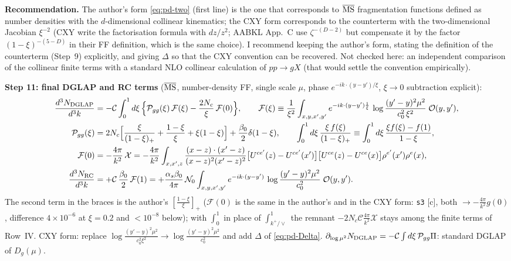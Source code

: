 \documentclass[10pt]{article}
\begin{document}
\medskip
\noindent\textbf{Recommendation.} The author's form \eqref{eq:pd-two} (first line) is the one that corresponds to $\overline{\rm MS}$ fragmentation functions defined as number densities with the $d$-dimensional collinear kinematics; the CXY form corresponds to the counterterm with the two-dimensional Jacobian $\xi^{-2}$ (CXY write the factorisation formula with $dz/z^{2}$; AABKL App.~C use $\zeta^{-(D-2)}$ but compensate it by the factor $(1-\xi)^{-(5-D)}$ in their FF definition, which is the same choice). I recommend keeping the author's form, stating the definition of the counterterm (Step~9) explicitly, and giving $\Delta$ so that the CXY convention can be recovered. Not checked here: an independent comparison of the collinear finite terms with a standard NLO collinear calculation of $pp\to gX$ (that would settle the convention empirically).

\medskip
\noindent\textbf{Step 11: final DGLAP and RC terms} ($\overline{\rm MS}$, number-density FF, single scale $\mu$, phase $e^{-ik\cdot(y-y')/\xi}$, $\xi\to0$ subtraction explicit):
\begin{align}
\frac{d^{3}N_{\rm DGLAP}}{d^{3}k}&=-\mathcal{C}\int_{0}^{1}d\xi\,\Big\{\mathcal{P}_{gg}(\xi)\,\mathcal{F}(\xi)-\frac{2N_{c}}{\xi}\,\mathcal{F}(0)\Big\},\qquad
\mathcal{F}(\xi)\equiv\frac{1}{\xi^{2}}\int_{x,y,x',y'}e^{-ik\cdot(y-y')\frac{1}{\xi}}\,\log\frac{(y'-y)^{2}\mu^{2}}{c_{0}^{2}\,\xi^{2}}\;\mathcal{O}(y,y'),\notag\\
\mathcal{P}_{gg}(\xi)&=2N_{c}\Big[\frac{\xi}{(1-\xi)_{+}}+\frac{1-\xi}{\xi}+\xi(1-\xi)\Big]+\frac{\beta_{0}}{2}\delta(1-\xi),\qquad\int_{0}^{1}d\xi\,\frac{\xi\,f(\xi)}{(1-\xi)_{+}}\equiv\int_{0}^{1}d\xi\,\frac{\xi f(\xi)-f(1)}{1-\xi},\notag\\
\mathcal{F}(0)&=-\frac{4\pi}{k^{2}}\,\mathcal{X}=-\frac{4\pi}{k^{2}}\int_{x,x',z}\frac{(x-z)\cdot(x'-z)}{(x-z)^{2}(x'-z)^{2}}\big[U^{ce'}(z)-U^{ce'}(x')\big]\big[U^{ce}(z)-U^{ce}(x)\big]\rho^{e'}(x')\rho^{e}(x),\notag\\
\frac{d^{3}N_{\rm RC}}{d^{3}k}&=+\mathcal{C}\,\frac{\beta_{0}}{2}\,\mathcal{F}(1)=+\frac{\alpha_{s}\beta_{0}}{4\pi}\,\mathcal{N}_{0}\int_{x,y,x',y'}e^{-ik\cdot(y-y')}\,\log\frac{(y'-y)^{2}\mu^{2}}{c_{0}^{2}}\;\mathcal{O}(y,y').
\label{eq:pd-final}
\end{align}
The second term in the braces is the author's $[\frac{1-\xi}{\xi}]_{+}$ ($\mathcal{F}(0)$ is the same in the author's and in the CXY form: \texttt{s3} [c], both $\to-\frac{4\pi}{k^{2}}g(0)$, difference $4\times10^{-6}$ at $\xi=0.2$ and $<10^{-8}$ below); with $\int_{0}^{1}$ in place of $\int_{k^{+}/\vee}^{1}$ the remnant $-2N_{c}\mathcal{C}\frac{4\pi}{k^{2}}\mathcal{X}$ stays among the finite terms of Row~IV. CXY form: replace $\log\frac{(y'-y)^{2}\mu^{2}}{c_{0}^{2}\xi^{2}}\to\log\frac{(y'-y)^{2}\mu^{2}}{c_{0}^{2}}$ and add $\Delta$ of \eqref{eq:pd-Delta}. $\partial_{\log\mu^{2}}N_{\rm DGLAP}=-\mathcal{C}\int d\xi\,\mathcal{P}_{gg}\Pi$: standard DGLAP of $D_{g}(\mu)$.
\end{document}
